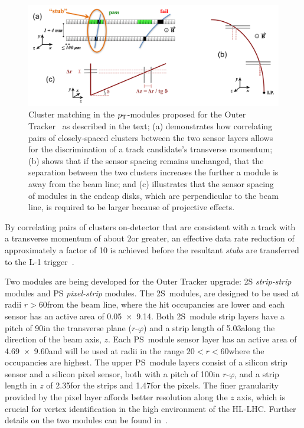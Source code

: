 \begin{figure}[!t]
\centering
\includegraphics[width=5in]{figs/tk-upgrade/pTsketches.png}
\caption{Cluster matching in the $p_{\mathrm{T}}$-modules proposed for the Outer Tracker~\cite{P2TrackerTDR} as described in the text; (a) demonstrates how correlating pairs of closely-spaced clusters between the two sensor layers allows for the discrimination of a track candidate's transverse momentum; (b) shows that if the sensor spacing remains unchanged, that the separation between the two clusters increases the further a module is away from the beam line; and (c) illustrates that the sensor spacing of modules in the endcap disks, which are perpendicular to the beam line, is required to be larger because of projective effects.
}
\label{fig:stubs}
\end{figure}

By correlating pairs of clusters on-detector that are consistent with a track with a transverse momentum of about 2\GeV or greater, an effective data rate reduction of approximately a factor of 10 is achieved before the resultant \emph{stubs} are transferred to the L-1 trigger~\cite{mpessimperf,2dptmoduleconcept}.

Two \pT modules are being developed for the Outer Tracker upgrade: 2S \emph{strip-strip} modules and PS \emph{pixel-strip} modules.
The 2S~modules, are designed to be used at radii $r>60$\cm from the beam line, where the hit occupancies are lower and each sensor has an active area of 0.05\cm~$\times$~9.14\cm.
Both 2S~module strip layers have a pitch of 90\mum in the transverse plane ($r$-$\varphi$) and a strip length of 5.03\cm along the direction of the beam axis, $z$.
Each PS~module sensor layer has an active area of 4.69\cm~$\times$~9.60\cm and will be used at radii in the range  $20<r<60$\cm where the occupancies are highest.
The upper PS~module layers consist of a silicon strip sensor and a silicon pixel sensor, both with a pitch of 100\mum in $r$-$\varphi$, and a strip length in $z$ of 2.35\cm for the strips and 1.47\mm for the pixels.
The finer granularity provided by the pixel layer affords better resolution along the $z$ axis, which is crucial for vertex identification in the high \PU environment of the HL-LHC.
Further details on the two \pT modules can be found in~\cite{CMS_Upgrade_TP,P2TrackerTDR}.

